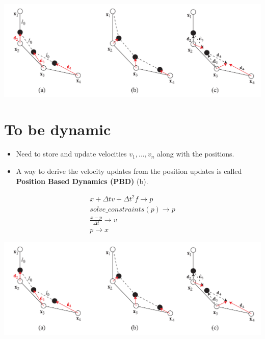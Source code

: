 \documentclass[
paper=192mm:144mm, %
fontsize=12pt, %
pagesize, %
parskip=half-, %
]{scrartcl} %
\theoremstyle{mythmstyle} %
\begin{document}
\begin{center}
\begin{framed}
\includegraphics[scale=0.5]{Bilder/2.png}
\end{framed}
\end{center}


\clearpage


\section{\color{white}To be dynamic}

\vspace{-1cm}
\begin{itemize}
\setlength\itemsep{-4mm}
\item Need to store and update velocities $v_1,...,v_n$ along with the positions.
\item A way to derive the velocity updates from the position updates is called\\ \textbf{Position Based Dynamics (PBD)} (b).
\end{itemize}

\vspace{-1cm}
\begin{eqnarray}
x + \Delta tv + \Delta t^2f \rightarrow p\\
solve\_constraints(p) \rightarrow p\\
\frac{x - p}{\Delta t} \rightarrow v\\
p \rightarrow x
\end{eqnarray}

\begin{center}
\begin{framed}
\includegraphics[scale=0.5]{Bilder/2.png}
\end{framed}
\end{center}
\end{document}
